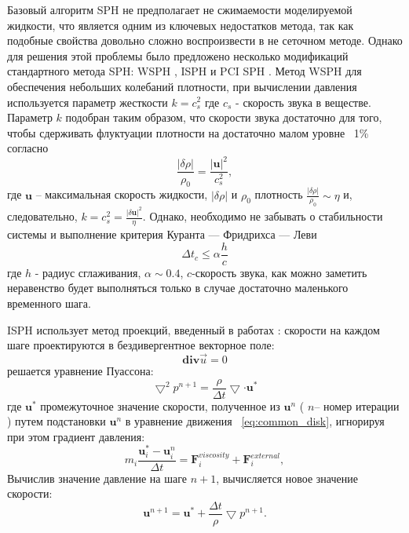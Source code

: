 Базовый алгоритм SPH не предполагает не сжимаемости моделируемой жидкости, что является одним из ключевых недостатков метода, так как подобные свойства довольно сложно воспроизвести в не сеточном методе. Однако для решения этой проблемы было предложено несколько модификаций стандартного метода SPH: WSPH \cite {Becker2007}, ISPH \cite {Shao2003, CUMMINS1999584} и PCI SPH \cite {Solenthaler2009}. Метод WSPH для обеспечения небольших колебаний плотности, при вычислении давления используется параметр жесткости \(k=c_{s}^2\) где \(c_{s}\) - скорость звука в веществе. Параметр \(k\) подобран таким образом, что скорости звука достаточно для того, чтобы сдерживать флуктуации плотности на достаточно малом уровне ~1\%  \cite {Solenthaler2009} согласно \cite {Monaghan2005}
\[
\frac{\left | \delta \rho \right |}{\rho_{0}}=\frac{\left | \boldsymbol{u} \right |^2}{c_{s}^2},
\]
где \(\boldsymbol{u}\) – максимальная скорость жидкости, \(\left | \delta \rho \right |\) и \(\rho_{0}\) плотность \(\frac{\left | \delta \rho \right |}{\rho_{0}} \sim \eta \) и, следовательно, \(k=c_{s}^{2}=\frac{\left | \delta \boldsymbol{u} \right |^{2}}{\eta}\). Однако, необходимо не  забывать о стабильности системы и выполнение критерия Куранта — Фридрихса — Леви \cite {Courant1967}
\[
\Delta t_{c} \leq \alpha \frac{h}{c}
\]
где \(h\) - радиус сглаживания, \(\alpha \sim 0.4\), \( c \)-скорость звука, как можно заметить неравенство будет выполняться только в случае достаточно маленького временного шага.

ISPH использует метод проекций, введенный в работах \cite {Temam1968, Chorin1968}: скорости на каждом шаге проектируются в бездивергентное векторное поле:
\[
\boldsymbol{div}\vec{u}=0
\]
решается уравнение Пуассона:
\begin{equation}
\label{eq:puasson}
\bigtriangledown^{2} p^{n+1}=\frac{\rho}{\Delta t}\bigtriangledown \cdot \boldsymbol{u}^{*}
\end{equation}
где \(\boldsymbol{u}^{*}\) промежуточное значение скорости, полученное из \(\boldsymbol{u}^{n}\) ( \(n\)– номер итерации ) путем подстановки \(\boldsymbol{u}^{n}\) в уравнение движения ~\ref{eq:common_disk}, игнорируя при этом градиент давления:
\[
m_i\frac{\textbf{u}_{i}^{*} -\textbf{u}_{i}^{n}}{\Delta t} = \mathbf{F}_i^{viscosity} + \mathbf{F}_i^{external},
\]
Вычислив значение давление на шаге \( n+1 \), вычисляется новое значение скорости:
\[
\textbf{u}^{n+1}=\textbf{u}^{*}+\frac{\Delta t}{\rho}\bigtriangledown p^{n+1}.
\]


